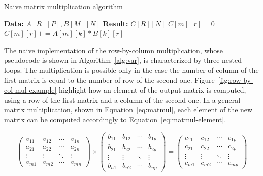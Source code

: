 \begin{algorithm}[t]
    \label{alg:matmul_pseudo}
    \caption{Naive matrix multiplication algorithm}
    \label{alg:var}
    \label{protocol1}
    \begin{algorithmic}[1]
    \STATE \textbf{Data:} $A[R][P], B[M][N]$
    \STATE \textbf{Result:} $C[R][N]$
    \STATE $C[m][r] = 0$
    \STATE $C[m][r] += A[m][k] * B[k][r]$
    \ENDFOR
    \ENDFOR
    \ENDFOR
    \ENDIF
    \end{algorithmic}
\end{algorithm}

The naive implementation of the row-by-column multiplication, whose pseudocode is shown in Algorithm~\ref{alg:var}, is characterized by three nested loops.
The multiplication is possible only in the case the number of column of the first matrix is equal to the number of row of the second one.
Figure~\ref{fig:row-by-col-mul-example} highlight how an element of the output matrix is computed, using a row of the first matrix and a column of the second one.
In a general matrix multiplication, shown in Equation~\ref{eq:matmul}, each element of the new matrix can be computed accordingly to Equation~\ref{eq:matmul-element}.

\begin{equation}
        \label{eq:matmul}
    \begin{pmatrix}
     a_{11} & a_{12} & \cdots & a_{1n}\\
     a_{21} & a_{22} & \cdots & a_{2n}\\
     \vdots & \vdots & \ddots & \vdots\\
     a_{m1} & a_{m2} & \cdots & a_{mn}
 \end{pmatrix}
 \times
 \begin{pmatrix}
     b_{11} & b_{12} & \cdots & b_{1p}\\
     b_{21} & b_{22} & \cdots & b_{2p}\\
     \vdots & \vdots & \ddots & \vdots\\
     b_{n1} & b_{n2} & \cdots & b_{np}
 \end{pmatrix}
  =
 \begin{pmatrix}
     c_{11} & c_{12} & \cdots & c_{1p}\\
     c_{21} & c_{22} & \cdots & c_{2p}\\
     \vdots & \vdots & \ddots & \vdots\\
     c_{m1} & c_{m2} & \cdots & c_{mp}
 \end{pmatrix}
\end{equation}

